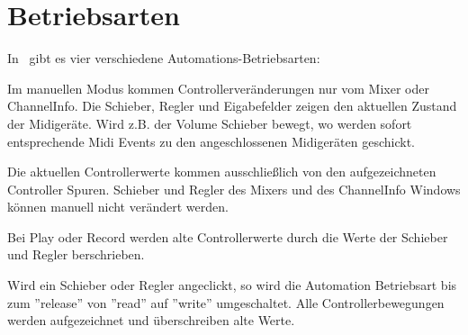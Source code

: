 
\section{Betriebsarten}

      In \M\ gibt es vier verschiedene Automations-Betriebsarten:

      \blank[big]
      Im manuellen Modus kommen Controllerveränderungen nur
      vom Mixer oder ChannelInfo. Die Schieber, Regler und
      Eigabefelder zeigen den aktuellen Zustand der Midigeräte.
      Wird z.B. der Volume Schieber bewegt, wo werden sofort
      entsprechende Midi Events zu den angeschlossenen Midigeräten
      geschickt.

      Die aktuellen Controllerwerte kommen ausschließlich von den
      aufgezeichneten Controller Spuren.
      Schieber und Regler des Mixers und des ChannelInfo Windows
      können manuell nicht verändert werden.

      Bei Play oder Record werden alte Controllerwerte
      durch die Werte der Schieber und Regler berschrieben.

      Wird ein Schieber oder Regler angeclickt, so wird die
      Automation Betriebsart bis zum ''release'' von ''read'' auf ''write''
      umgeschaltet. Alle Controllerbewegungen werden aufgezeichnet
      und überschreiben alte Werte.

      \blank[big]

